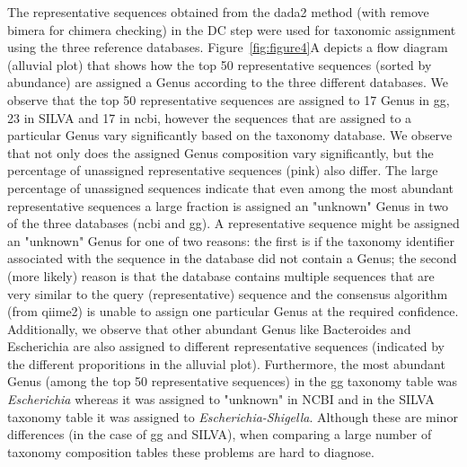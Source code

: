   The representative sequences obtained from the \ac{dada2} method (with remove bimera for chimera checking) in the DC step were used for taxonomic assignment using the three reference databases.
  Figure~\ref{fig:figure4}A depicts a flow diagram (alluvial plot) that shows how the top 50 representative sequences (sorted by abundance) are assigned a Genus according to the three different databases.
  We observe that the top 50 representative sequences are assigned to 17 Genus in \ac{gg}, 23 in SILVA and 17 in \ac{ncbi}, however the sequences that are assigned to a particular Genus vary significantly based on the taxonomy database.
  We observe that not only does the assigned Genus composition vary significantly, but the percentage of unassigned representative sequences (pink) also differ.
  The large percentage of unassigned sequences indicate that even among the most abundant representative sequences a large fraction is assigned an "unknown" Genus in two of the three databases (\ac{ncbi} and \ac{gg}).
  A representative sequence might be assigned an "unknown" Genus for one of two reasons: the first is if the taxonomy identifier associated with the sequence in the database did not contain a Genus; the second (more likely) reason is that the database contains multiple sequences that are very similar to the query (representative) sequence and the consensus algorithm (from \ac{qiime2}) is unable to assign one particular Genus at the required confidence.
  Additionally, we observe that other abundant Genus like Bacteroides and Escherichia are also assigned to different representative sequences (indicated by the different proporitions in the alluvial plot).
  Furthermore, the most abundant Genus (among the top 50 representative sequences) in the \ac{gg} taxonomy table was \textit{Escherichia} whereas it was assigned to "unknown" in NCBI and in the SILVA taxonomy table it was assigned to \textit{Escherichia-Shigella}.
  Although these are minor differences (in the case of \ac{gg} and SILVA), when comparing a large number of taxonomy composition tables these problems are hard to diagnose.

